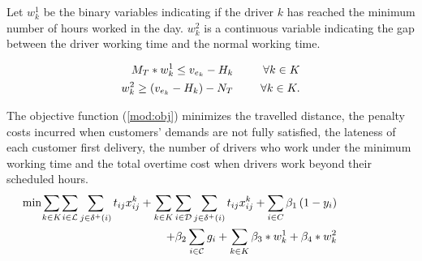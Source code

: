 \documentclass{article}
\begin{document}
Let $w^1_k$ be the binary variables indicating if the driver $k$ has reached the minimum number of hours worked in the day. $w^2_k$ is a continuous variable indicating the gap between the driver working time and the normal working time.

\begin{alignat}{3}
    \label{mod:c27}  M_T*w^1_k \leq v_{e_k} - H_k & \hspace{5mm} &\forall k \in K \\
    \label{mod:c28}  w^2_k \geq (v_{e_k} - H_k) - N_T & \hspace{5mm} &\forall k \in K.
\end{alignat}

The objective function (\ref{mod:obj}) minimizes the travelled distance, the penalty costs incurred when customers' demands are not fully satisfied, the lateness of each customer first delivery, the number of drivers who work under the minimum working time and the total overtime cost when drivers work beyond their scheduled hours.
\begin{align}
\label{mod:obj}
\hspace{-20mm}
    \begin{split}
      \min  \smashoperator{\sum_{k \in K}} \sum_{ \substack{i \in \mathcal{L}} } \sum_{ j \in \delta^{+}{(i)} } {t_{ij}x^{k}_{ij}} + 
      \sum_{k \in K} \sum_{ \substack{i \in \mathcal{D}}} \sum_{j \in \delta^{+}{(i)} } {t_{ij}x^{k}_{ij}} + 
      \smashoperator{\sum_{ i \in C}}{ \beta_1 \left(1-y_i\right)} \hspace{-0mm} \\ +
      \beta_2 \smashoperator{ \sum_{i \in \mathcal{C} } } { g_i  } 
      +  \sum_{k \in K}{\beta_3* w^{1}_k } + \beta_4 *{ w^{2}_k }
    \end{split}
\end{align}
\end{document}
